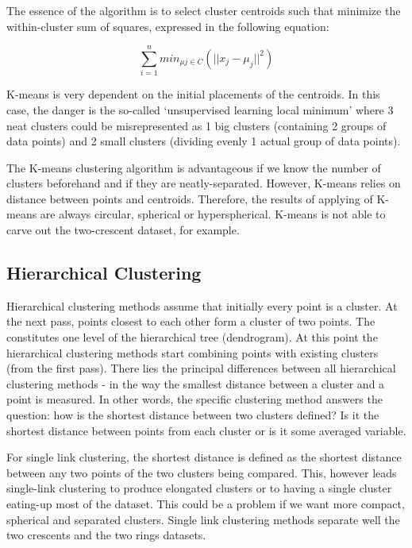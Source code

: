 \documentclass{article}
\begin{document}
The essence of the algorithm is to select cluster centroids such that minimize the within-cluster sum of squares, expressed in the following equation:

\begin{equation}
  \sum_{i = 1}^{n} min_{\mu j \in C} \left( ||x_j - \mu_j||^2 \right)
\end{equation}

K-means is very dependent on the initial placements of the centroids. In this case, the danger is the so-called ‘unsupervised learning local minimum’ where 3 neat clusters could be misrepresented as 1 big clusters (containing 2 groups of data points) and 2 small clusters (dividing evenly 1 actual group of data points).

The K-means clustering algorithm is advantageous if we know the number of clusters beforehand and if they are neatly-separated. However, K-means relies on distance between points and centroids. Therefore, the results of applying of K-means are always circular, spherical or hyperspherical. K-means is not able to carve out the two-crescent dataset, for example.

\subsection{Hierarchical Clustering}
Hierarchical clustering methods assume that initially every point is a cluster. At the next pass, points closest to each other form a cluster of two points. The constitutes one level of the hierarchical tree (dendrogram). At this point the hierarchical clustering methods start combining points with existing clusters (from the first pass). There lies the principal differences between all hierarchical clustering methods - in the way the smallest distance between a cluster and a point is measured. In other words, the specific clustering method answers the question: how is the shortest distance between two clusters defined? Is it the shortest distance between points from each cluster or is it some averaged variable.

For single link clustering, the shortest distance is defined as the shortest distance between any two points of the two clusters being compared. This, however leads single-link clustering to produce elongated clusters or to having a single cluster eating-up most of the dataset. This could be a problem if we want more compact, spherical and separated clusters. Single link clustering methods separate well the two crescents and the two rings datasets.
\end{document}
